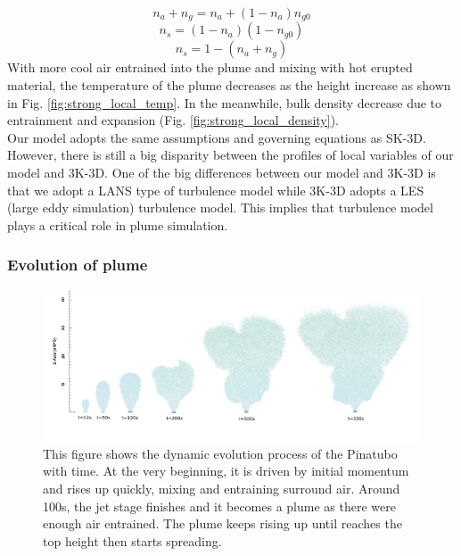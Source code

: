 \documentclass[journal abbreviation, manuscript]{copernicus}
\begin{document}
\begin{equation}
n_a + n_g = n_a + (1-n_a) n_{g0}
\label{eq:gas-frac-express}
\end{equation}
\begin{equation}
n_s = (1 - n_a) (1- n_{g0})
\label{eq:solid-frac-express1}
\end{equation}
\begin{equation}
n_s = 1 - (n_a + n_g)
\label{eq:solid-frac-express2}
\end{equation}
With more cool air entrained into the plume and mixing with hot erupted material, the temperature of the plume decreases as the height increase as shown in Fig. \ref{fig:strong_local_temp}. In the meanwhile, bulk density decrease due to entrainment and expansion (Fig. \ref{fig:strong_local_density}).\\
Our model adopts the same assumptions and governing equations as SK-3D. However, there is still a big disparity between the profiles of local variables of our model and 3K-3D. One of the big differences between our model and 3K-3D is that we adopt a LANS type of turbulence model while 3K-3D adopts a LES (large eddy simulation) turbulence model. This implies that turbulence model plays a critical role in plume simulation.
\subsubsection{Evolution of plume} 
\begin{figure}
\center
\includegraphics[width=15cm]{strong_elevation}
\caption{This figure shows the dynamic evolution process of the Pinatubo with time. At the very beginning, it is driven by initial momentum and rises up quickly, mixing and entraining surround air. Around 100s, the jet stage finishes and it becomes a plume as there were enough air entrained. The plume keeps rising up until reaches the top height then starts spreading.}
\label{fig:strong_elevation}
\end{figure}
\end{document}
